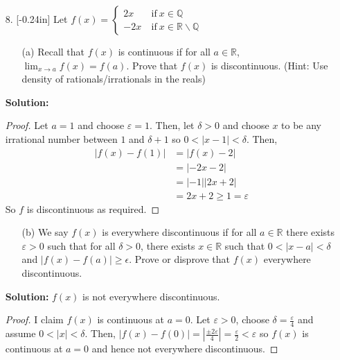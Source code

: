 \documentclass[letterpaper,12pt]{article}
\theoremstyle{definition}
\begin{document}
\pagebreak
\begin{enumerate}
    \item[8.] \reversemarginpar{}[-0.24in] Let $f(x) = \begin{cases}
        2x \ &\text{if} \ x \in \mathbb{Q}\\ -2x \ &\text{if} \ x\in \mathbb{R}\backslash\mathbb{Q}
    \end{cases}$  \begin{enumerate}
        \item[(a)] Recall that $f(x)$ is continuous if for all $a \in \mathbb{R}$, $\lim_{x\rightarrow a}f(x)=f(a)$. Prove that $f(x)$ is discontinuous. (Hint: Use density of rationals/irrationals in the reals)
    \end{enumerate}
    \begin{mdframed}
        \textbf{Solution:} \begin{proof}
            Let $a = 1$ and choose $\varepsilon = 1$. Then, let $\delta > 0$ and choose $x$ to be any irrational number between $1$ and $\delta + 1$ so $0 < |x-1| < \delta$. Then, \begin{align*}
                |f(x) - f(1) | &= |f(x) - 2| \\
                &= |-2x-2| \\
                &= |-1||2x+2| \\
                &= 2x+2 \geq 1 = \varepsilon
            \end{align*}
            So $f$ is discontinuous as required.
        \end{proof}
    \end{mdframed}
\end{enumerate}
\pagebreak
\begin{enumerate}
    \item[] \begin{enumerate}
        \item[(b)] We say $f(x)$ is everywhere discontinuous if for all $a \in \mathbb{R}$ there exists $\varepsilon > 0$ such that for all $\delta > 0$, there exists $x\in\mathbb{R}$ such that $0<|x-a|<\delta$ and $|f(x)-f(a)| \geq \epsilon$. Prove or disprove that $f(x)$ everywhere discontinuous.
    \end{enumerate}
    \begin{mdframed}
        \textbf{Solution:}  $f(x)$ is not everywhere discontinuous. \renewcommand{\proofname}{Disproof} \begin{proof}
            I claim $f(x)$ is continuous at $a=0$. Let $\varepsilon > 0$, choose $\delta =\frac{\varepsilon}{4}$ and assume $0<|x| < \delta$. Then, $  |f(x)-f(0)| = \left |\frac{\pm 2\varepsilon}{4} \right |
            = \frac{\varepsilon}{2} < \varepsilon$ so $f(x)$ is continuous at $a=0$ and hence not everywhere discontinuous.
        \end{proof}
    \end{mdframed}
\end{enumerate}
\end{document}
